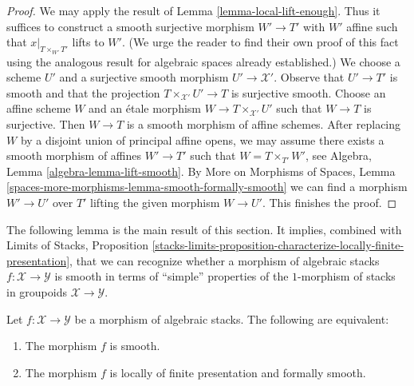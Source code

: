 \begin{proof}
We may apply the result of Lemma \ref{lemma-local-lift-enough}.
Thus it suffices to construct a smooth surjective morphism
$W' \to T'$ with $W'$ affine such that
$x|_{T \times_{W'} T'}$ lifts to $W'$.
(We urge the reader to find their own proof of this fact
using the analogous result for algebraic spaces already
established.) We choose a
scheme $U'$ and a surjective smooth morphism $U' \to \mathcal{X}'$.
Observe that $U' \to T'$ is smooth and that the projection
$T \times_{\mathcal{X}'} U' \to T$ is surjective smooth.
Choose an affine scheme $W$ and an \'etale morphism
$W \to T \times_{\mathcal{X}'} U'$ such that $W \to T$
is surjective. Then $W \to T$ is a smooth morphism of
affine schemes. After replacing $W$ by a disjoint union of
principal affine opens, we may assume there exists a
smooth morphism of affines $W' \to T'$ such that
$W = T \times_{T'} W'$, see Algebra, Lemma \ref{algebra-lemma-lift-smooth}.
By More on Morphisms of Spaces, Lemma
\ref{spaces-more-morphisms-lemma-smooth-formally-smooth}
we can find a morphism $W' \to U'$ over $T'$ lifting
the given morphism $W \to U'$. This finishes the proof.
\end{proof}

\noindent
The following lemma is the main result of this section.
It implies, combined with
Limits of Stacks, Proposition
\ref{stacks-limits-proposition-characterize-locally-finite-presentation},
that we can recognize whether a morphism of algebraic stacks
$f : \mathcal{X} \to \mathcal{Y}$ is smooth in terms of
``simple'' properties of the $1$-morphism of stacks in groupoids
$\mathcal{X} \to \mathcal{Y}$.

\begin{lemma}
\label{lemma-smooth-formally-smooth}
Let $f : \mathcal{X} \to \mathcal{Y}$ be a morphism of algebraic stacks.
The following are equivalent:
\begin{enumerate}
\item The morphism $f$ is smooth.
\item The morphism $f$ is locally of finite presentation and
formally smooth.
\end{enumerate}
\end{lemma}

